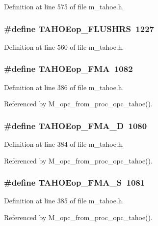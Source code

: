 Definition at line 575 of file m\_\-tahoe.h.
\subsubsection{\setlength{\rightskip}{0pt plus 5cm}\#define TAHOEop\_\-FLUSHRS~1227}\label{m__tahoe_8h_48c0d157e54e3c7518a3895d9360a9e9}




Definition at line 560 of file m\_\-tahoe.h.
\subsubsection{\setlength{\rightskip}{0pt plus 5cm}\#define TAHOEop\_\-FMA~1082}\label{m__tahoe_8h_cd7cafa05f0d0d86846442fbd7c4c63a}




Definition at line 386 of file m\_\-tahoe.h.

Referenced by M\_\-opc\_\-from\_\-proc\_\-opc\_\-tahoe().
\subsubsection{\setlength{\rightskip}{0pt plus 5cm}\#define TAHOEop\_\-FMA\_\-D~1080}\label{m__tahoe_8h_508a69cacd68631ced6c59a72b492ce5}




Definition at line 384 of file m\_\-tahoe.h.

Referenced by M\_\-opc\_\-from\_\-proc\_\-opc\_\-tahoe().
\subsubsection{\setlength{\rightskip}{0pt plus 5cm}\#define TAHOEop\_\-FMA\_\-S~1081}\label{m__tahoe_8h_fb6497cf07c54f2b3da112f7dd2fc849}




Definition at line 385 of file m\_\-tahoe.h.

Referenced by M\_\-opc\_\-from\_\-proc\_\-opc\_\-tahoe().
